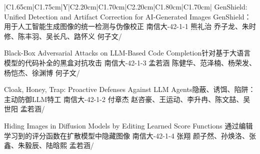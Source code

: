 

\Needspace{7.5cm}
\begin{tabularx}{\textwidth}{|C{1.65cm}|C{1.75cm}|Y|C{2.20cm}|C{1.70cm}|C{2.20cm}|C{1.80cm}|C{1.70cm}|}
\HeaderRow
{}
{GenShield: Unified Detection and Artifact Correction for AI-Generated Images\newline
GenShield：用于人工智能生成图像的统一检测与伪像校正}
{南信大-42-1-1}
{熊礼治}
{乔子龙、朱时修、陈丰羽、吴长凡、路怀义}
{何子文}{/}

{Black-Box Adversarial Attacks on LLM-Based Code Completion\newline 针对基于大语言模型的代码补全的黑盒对抗攻击}
{南信大-42-1-3}
{孟若涵}
{陈健华、范泽楠、杨荣发、杨恺杰、徐渊博}
{何子文}{/}


{Cloak, Honey, Trap: Proactive Defenses Against LLM Agents\newline 隐蔽、诱饵、陷阱：主动防御LLM特工}
{南信大-42-1-2}
{付章杰}
{赵咨豪、王运动、李升冉、陈文喆、吴世阳}
{孟若涵}{/}

{Hiding Images in Diffusion Models by Editing Learned Score Functions \newline 通过编辑学习到的评分函数在扩散模型中隐藏图像}
{南信大-42-1-4}
{张翔}
{颜子然、孙焕洛、张鑫、朱毅辰、陆晗熙}
{孟若涵}{/}
\end{tabularx}
\BlockGap



